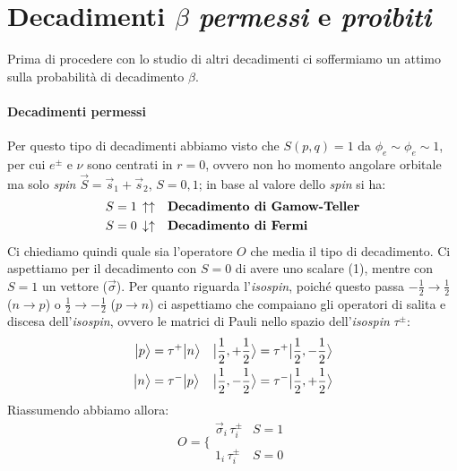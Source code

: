 \section{Decadimenti $\beta$ \textit{permessi} e \textit{proibiti}}
Prima di procedere con lo studio di altri decadimenti ci soffermiamo un attimo sulla probabilità di decadimento $\beta$.

\paragraph{Decadimenti permessi} Per questo tipo di decadimenti abbiamo visto che $S(p,q)=1$ da $\phi_e\sim\phi_e\sim1$, per cui $e^\pm$ e $\nu$ sono centrati in $r=0$, ovvero non ho momento angolare orbitale ma solo \textit{spin} $\vec{S} = \vec{s}_1 + \vec{s}_2$, $S=0,1$; in base al valore dello \textit{spin} si ha:
\begin{displaymath}
\begin{aligned}
S = 1&\,\uparrow\uparrow & &\text{\textbf{Decadimento di Gamow-Teller}}\index{decadimento di!Gamow-Teller} \\
S = 0&\,\downarrow\uparrow & &\text{\textbf{Decadimento di Fermi}}\index{decadimento di!Fermi} 
\end{aligned}
\end{displaymath}
Ci chiediamo quindi quale sia l'operatore $O$ che media il tipo di decadimento. Ci aspettiamo per il decadimento con $S=0$ di avere uno scalare (1), mentre con $S=1$ un vettore ($\vec{\sigma}$). Per quanto riguarda l'\textit{isospin}, poiché questo passa $-\frac{1}{2} \to \frac{1}{2}$ ($n\to p$) o $\frac{1}{2} \to -\frac{1}{2}$ ($p\to n$)  ci aspettiamo che compaiano gli operatori di salita e discesa dell'\textit{isospin}, ovvero le matrici di Pauli nello spazio dell'\textit{isospin} $\tau^\pm$:
\begin{displaymath}
\begin{aligned}
\bigl | p \bigr \rangle&=\tau^+\bigl | n \bigr \rangle & \bigl | \frac{1}{2},+\frac{1}{2} \bigr \rangle &= \tau^+ \bigl | \frac{1}{2},-\frac{1}{2} \bigr \rangle\\
\bigl | n \bigr \rangle&=\tau^-\bigl | p \bigr \rangle & \bigl | \frac{1}{2},-\frac{1}{2} \bigr \rangle &= \tau^- \bigl | \frac{1}{2},+\frac{1}{2} \bigr \rangle
\end{aligned}
\end{displaymath}
Riassumendo abbiamo allora:
\begin{displaymath}
O = \Biggl \{
\begin{array}{ll}
    \vec{\sigma}_i \, \tau^\pm_i & S=1\\
     & \\
    1_i \, \tau^\pm_i & S=0 
\end{array}
\end{displaymath}

